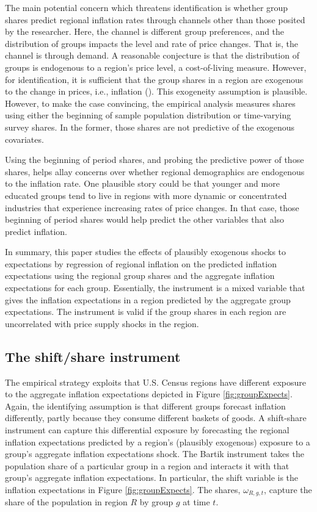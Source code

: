 \documentclass[12pt]{article}
\begin{document}
The main potential concern which threatens identification is whether group shares predict regional inflation rates through channels other than those posited by the researcher. Here, the channel is different group preferences, and the distribution of groups impacts the level and rate of price changes. That is, the channel is through demand. A reasonable conjecture is that the distribution of groups is endogenous to a region's price level, a cost-of-living measure. However, for identification, it is sufficient that the group shares in a region are exogenous to the change in prices, i.e., inflation (\cite{Pinkhametal:AER2020}). This exogeneity assumption is plausible. However, to make the case convincing, the empirical analysis measures shares using either the beginning of sample population distribution or time-varying survey shares. In the former, those shares are not predictive of the exogenous covariates.

Using the beginning of period shares, and probing the predictive power of those shares, helps allay concerns over whether regional demographics are endogenous to the inflation rate. One plausible story could be that younger and more educated groups tend to live in regions with more dynamic or concentrated industries that experience increasing rates of price changes. In that case, those beginning of period shares would help predict the other variables that also predict inflation.  

In summary, this paper studies the effects of plausibly exogenous shocks to expectations by regression of regional inflation on the predicted inflation expectations using the regional group shares and the aggregate inflation expectations for each group. Essentially, the instrument is a mixed variable that gives the inflation expectations in a region predicted by the aggregate group expectations. The instrument is valid if the group shares in each region are uncorrelated with price supply shocks in the region.

 \subsection{The shift/share instrument}

The empirical strategy exploits that U.S. Census regions have different exposure to the aggregate inflation expectations depicted in Figure \ref{fig:groupExpects}. Again, the identifying assumption is that different groups forecast inflation differently, partly because they consume different baskets of goods. A shift-share instrument can capture this differential exposure by forecasting the regional inflation expectations predicted by a region's (plausibly exogenous) exposure to a group's aggregate inflation expectations shock. The Bartik instrument takes the population share of a particular group in a region and interacts it with that group's aggregate inflation expectations. In particular, the shift variable is the inflation expectations in Figure \ref{fig:groupExpects}. The shares, $\omega_{R,g,t}$, capture the share of the population in region $R$ by group $g$ at time $t$.  
\end{document}
